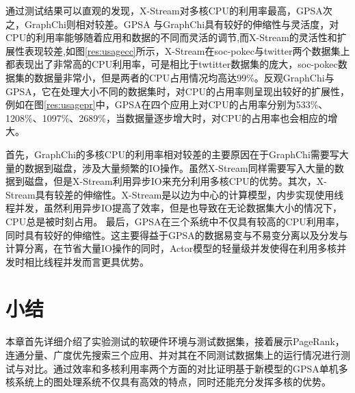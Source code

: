 通过测试结果可以直观的发现，X-Stream对多核CPU的利用率最高，GPSA次之，GraphChi则相对较差。GPSA
与GraphChi具有较好的伸缩性与灵活度，对CPU的利用率能够随着应用和数据的不同而灵活的调节,而X-Stream的灵活性和扩展性表现较差,如图\ref{res:usagecc}所示，X-Stream在soc-pokec与twitter两个数据集上都表现出了非常高的CPU利用率，可是相比于twtitter数据集的庞大，soc-pokec数据集的数据量非常小，但是两者的CPU占用情况均高达99\%。反观GraphChi与GPSA，它在处理大小不同的数据集时，对CPU的占用率则呈现出较好的扩展性，例如在图\ref{res:usagepr}中，GPSA在四个应用上对CPU的占用率分别为533\%、1208\%、1097\%、2689\%，当数据量逐步增大时，对CPU的占用率也会相应的增大。

首先，GraphChi的多核CPU的利用率相对较差的主要原因在于GraphChi需要写大量的数据到磁盘，涉及大量频繁的IO操作。虽然X-Stream同样需要写入大量的数据到磁盘，但是X-Stream利用异步IO来充分利用多核CPU的优势。其次，X-Stream具有较差的伸缩性。X-Stream是以边为中心的计算模型，内步实现使用线程并发，虽然利用异步IO提高了效率，但是也导致在无论数据集大小的情况下，CPU总是被时刻占用。
最后，GPSA在三个系统中不仅具有较高的CPU利用率，同时具有较好的伸缩性。这主要得益于GPSA的数据易变与不易变分离以及分发与计算分离，在节省大量IO操作的同时，Actor模型的轻量级并发使得在利用多核并发时相比线程并发而言更具优势。







\section{小结}

本章首先详细介绍了实验测试的软硬件环境与测试数据集，接着展示PageRank，连通分量、广度优先搜索三个应用、并对其在不同测试数据集上的运行情况进行测试与对比。通过效率和多核利用率两个方面的对比证明基于新模型的GPSA单机多核系统上的图处理系统不仅具有高效的特点，同时还能充分发挥多核的优势。





